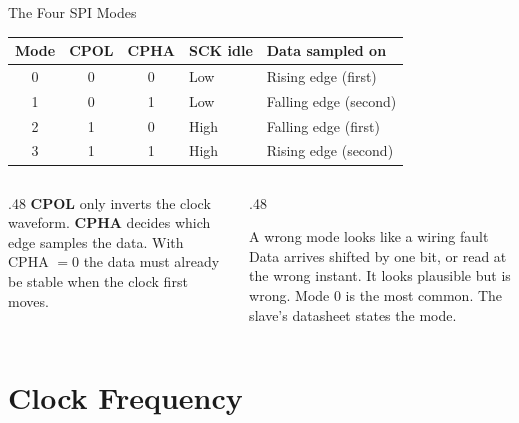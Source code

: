 \documentclass[9pt,aspectratio=169,xcolor=table]{beamer}
\begin{document}
\begin{frame}{The Four SPI Modes}
    \begin{center}
    {\small
    \striped
    \begin{tabular}{@{}c c c l l@{}}
        \toprule
        \textbf{Mode} & \textbf{CPOL} & \textbf{CPHA} & \textbf{SCK idle} & \textbf{Data sampled on} \\
        \midrule
        0 & 0 & 0 & Low  & Rising edge (first) \\
        1 & 0 & 1 & Low  & Falling edge (second) \\
        2 & 1 & 0 & High & Falling edge (first) \\
        3 & 1 & 1 & High & Rising edge (second) \\
        \bottomrule
    \end{tabular}}
    \end{center}

    \vspace{3mm}
    \begin{columns}[T]
    \begin{column}{.48\textwidth}
        {\small \textbf{CPOL} only inverts the clock waveform. \textbf{CPHA} decides which edge samples the data. With CPHA $=0$ the data must already be stable when the clock first moves.}
    \end{column}
    \begin{column}{.48\textwidth}
        \begin{block}{A wrong mode looks like a wiring fault}
            {\small Data arrives shifted by one bit, or read at the wrong instant. It looks plausible but is wrong. \alert{Mode 0 is the most common.} The slave's datasheet states the mode.}
        \end{block}
    \end{column}
    \end{columns}
\end{frame}


\section{Clock Frequency}
\end{document}
